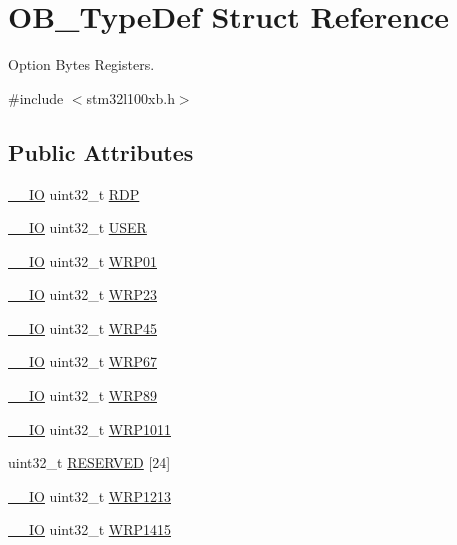 \hypertarget{struct_o_b___type_def}{\section{O\-B\-\_\-\-Type\-Def Struct Reference}
\label{struct_o_b___type_def}
}


Option Bytes Registers.  




{\ttfamily \#include $<$stm32l100xb.\-h$>$}

\subsection*{Public Attributes}
\begin{DoxyCompactItemize}
\item 
\hyperlink{core__sc300_8h_aec43007d9998a0a0e01faede4133d6be}{\-\_\-\-\_\-\-I\-O} uint32\-\_\-t \hyperlink{struct_o_b___type_def_a431dc8b09670085199c380017243c0ea}{R\-D\-P}
\item 
\hyperlink{core__sc300_8h_aec43007d9998a0a0e01faede4133d6be}{\-\_\-\-\_\-\-I\-O} uint32\-\_\-t \hyperlink{struct_o_b___type_def_a21dbc215f1bc3a7b2d26538a7a5fdfdd}{U\-S\-E\-R}
\item 
\hyperlink{core__sc300_8h_aec43007d9998a0a0e01faede4133d6be}{\-\_\-\-\_\-\-I\-O} uint32\-\_\-t \hyperlink{struct_o_b___type_def_a6db927d69c0fa4753d732278702f5ba1}{W\-R\-P01}
\item 
\hyperlink{core__sc300_8h_aec43007d9998a0a0e01faede4133d6be}{\-\_\-\-\_\-\-I\-O} uint32\-\_\-t \hyperlink{struct_o_b___type_def_acaba2c9c4bd8bebe7b72f8ffc0bee63d}{W\-R\-P23}
\item 
\hyperlink{core__sc300_8h_aec43007d9998a0a0e01faede4133d6be}{\-\_\-\-\_\-\-I\-O} uint32\-\_\-t \hyperlink{struct_o_b___type_def_a7e9fb00f640fdadfa2142c85b562467e}{W\-R\-P45}
\item 
\hyperlink{core__sc300_8h_aec43007d9998a0a0e01faede4133d6be}{\-\_\-\-\_\-\-I\-O} uint32\-\_\-t \hyperlink{struct_o_b___type_def_aeee96ac5e2dea75ccaec85ef502ec441}{W\-R\-P67}
\item 
\hyperlink{core__sc300_8h_aec43007d9998a0a0e01faede4133d6be}{\-\_\-\-\_\-\-I\-O} uint32\-\_\-t \hyperlink{struct_o_b___type_def_a47af06105b059a6968c01b5c33e77f5c}{W\-R\-P89}
\item 
\hyperlink{core__sc300_8h_aec43007d9998a0a0e01faede4133d6be}{\-\_\-\-\_\-\-I\-O} uint32\-\_\-t \hyperlink{struct_o_b___type_def_a654f411ab93f1115801fae502576f983}{W\-R\-P1011}
\item 
uint32\-\_\-t \hyperlink{struct_o_b___type_def_abdb0d4bf1daca662a75a6fbed065e887}{R\-E\-S\-E\-R\-V\-E\-D} \mbox{[}24\mbox{]}
\item 
\hyperlink{core__sc300_8h_aec43007d9998a0a0e01faede4133d6be}{\-\_\-\-\_\-\-I\-O} uint32\-\_\-t \hyperlink{struct_o_b___type_def_a18778e034221d6d0faf533b0304c6ab6}{W\-R\-P1213}
\item 
\hyperlink{core__sc300_8h_aec43007d9998a0a0e01faede4133d6be}{\-\_\-\-\_\-\-I\-O} uint32\-\_\-t \hyperlink{struct_o_b___type_def_a099ecaa23da9e2aa5da40e7d8cacc2fc}{W\-R\-P1415}
\end{DoxyCompactItemize}


